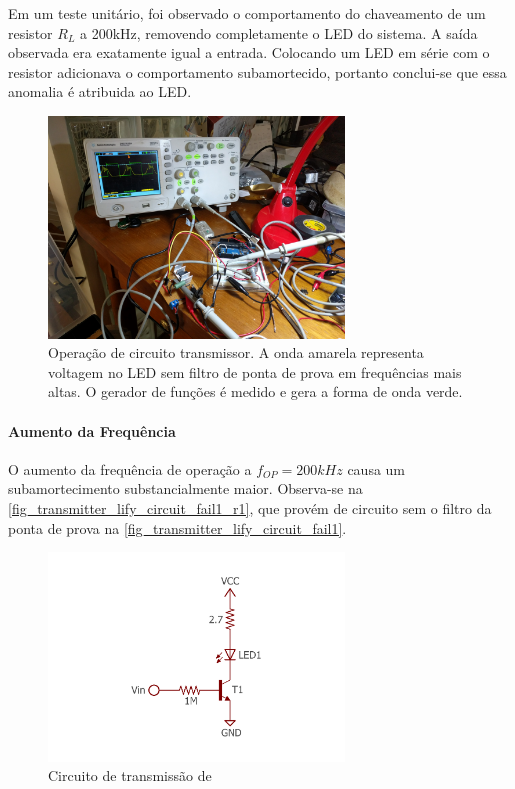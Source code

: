 		Em um teste unitário, foi observado o comportamento do chaveamento de um resistor $R_{L}$ a 200kHz, removendo completamente o LED do sistema. A saída observada era exatamente igual a entrada. Colocando um LED em série com o resistor adicionava o comportamento subamortecido, portanto conclui-se que essa anomalia é atribuida ao LED.
				
		\begin{figure}[htb]
			\caption{\label{fig_transmitter_lify_circuit_fail1_r1} Operação de circuito transmissor. A onda amarela representa voltagem no LED sem filtro de ponta de prova em frequências mais altas. O gerador de funções é medido e gera a forma de onda verde.}
			\centering		%
			\includegraphics[width=0.7\textwidth, trim={20cm 15cm 50cm 10cm}, clip]{circuits/photos/TX_200k_without_filter.jpg}
		\end{figure}
		
		\paragraph{Aumento da Frequência}
		
		O aumento da frequência de operação a $f_{OP} = 200kHz$ causa um subamortecimento substancialmente maior. Observa-se na \autoref{fig_transmitter_lify_circuit_fail1_r1}, que provém de circuito sem o filtro da ponta de prova na \autoref{fig_transmitter_lify_circuit_fail1}.
		
		\begin{figure}[htb]
			\caption{\label{fig_transmitter_lify_circuit_fail1} Circuito de transmissão de}
			\centering		%
			\includegraphics[width=0.7\textwidth, trim={2cm 1cm 2cm 1cm}, clip]{circuits/transmitter_fail1.pdf}
		\end{figure}
		
